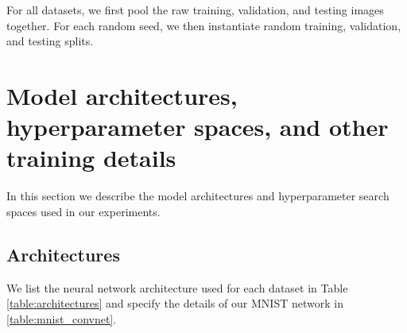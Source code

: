 \documentclass{article}
\begin{document}
For all datasets, we first pool the raw training, validation, and testing images together.
%
For each random seed, we then instantiate random training, validation, and testing splits.

\clearpage
\newpage
\section{Model architectures, hyperparameter spaces, and other training details}
\label{sec:architectures}

In this section we describe the model architectures and hyperparameter search spaces used in our experiments.

\subsection{Architectures}

We list the neural network architecture used for each dataset in Table \ref{table:architectures} and specify the details of our MNIST network in \ref{table:mnist_convnet}.
\end{document}

